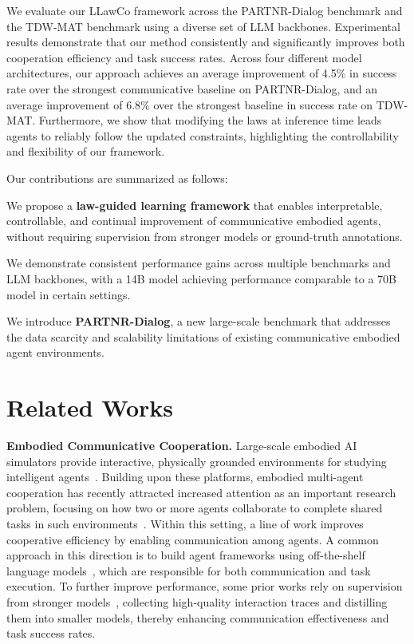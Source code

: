 \documentclass{article}
\theoremstyle{plain}
\theoremstyle{definition}
\theoremstyle{remark}
\newcommand{\name}{LLawCo\xspace}
\begin{document}
We evaluate our \name framework across the PARTNR-Dialog benchmark and the TDW-MAT benchmark using a diverse set of LLM backbones. Experimental results demonstrate that our method consistently and significantly improves both cooperation efficiency and task success rates. Across four different model architectures, our approach achieves an average improvement of 4.5\% in success rate over the strongest communicative baseline on PARTNR-Dialog, and an average improvement of 6.8\% over the strongest baseline in success rate on TDW-MAT. Furthermore, we show that modifying the laws at inference time leads agents to reliably follow the updated constraints, highlighting the controllability and flexibility of our framework.

Our contributions are summarized as follows:

\noindent\textbullet{} We propose a \textbf{law-guided learning framework} that enables interpretable, controllable, and continual improvement of communicative embodied agents, without requiring supervision from stronger models or ground-truth annotations.

\noindent\textbullet{} We demonstrate consistent performance gains across multiple benchmarks and LLM backbones, with a 14B model achieving performance comparable to a 70B model in certain settings.

\noindent\textbullet{} We introduce \textbf{PARTNR-Dialog}, a new large-scale benchmark that addresses the data scarcity and scalability limitations of existing communicative embodied agent environments.

\section{Related Works}

\textbf{Embodied Communicative Cooperation.} Large-scale embodied AI simulators provide interactive, physically grounded environments for studying intelligent agents~\cite{deepmind-lab, house3d, xiang2020sapien, li2024behavior1k, virtualhome, ai2thor, chalet, isaacgym}. 
Building upon these platforms, embodied multi-agent cooperation has recently attracted increased attention as an important research problem, focusing on how two or more agents collaborate to complete shared tasks in such environments~\cite{habitat3, partnr, wah, jain2020cordial, szot2023adaptive, zhang2024proagent, zhang2024towards, zhang2024combo, chen2024scalable, zhou2025virtualcommunityopenworld}. Within this setting, a line of work improves cooperative efficiency by enabling communication among agents. 
A common approach in this direction is to build agent frameworks using off-the-shelf language models~\cite{roco, nayak2024long, capo, cots, ling2025elhplan, li2025learn, comm-partnr}, which are responsible for both communication and task execution. To further improve performance, some prior works rely on supervision from stronger models~\cite{coela, partnr}, collecting high-quality interaction traces and distilling them into smaller models, thereby enhancing communication effectiveness and task success rates.
\end{document}
